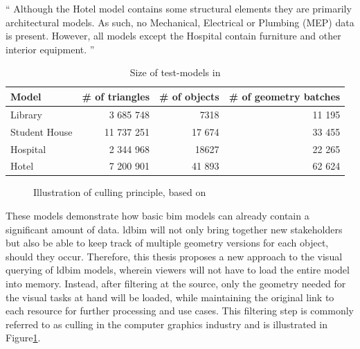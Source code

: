 \enquote{
	Although the Hotel model contains some structural elements they are primarily architectural models. As such, no Mechanical, Electrical or Plumbing (MEP) data is present. However, all models except the Hospital contain furniture and other interior equipment.
} \parencite{Johansson2015}

\begin{table}[h]
	\centering
	\begin{tabular}{@{}lrrr@{}}
		\toprule
		Model         & \multicolumn{1}{l}{\# of  triangles} & \multicolumn{1}{l}{\# of objects} & \multicolumn{1}{l}{\# of geometry batches} \\ \midrule
		Library       & 3 685 748                            & 7318                              & 11 195                                     \\
		Student House & 11 737 251                           & 17 674                            & 33 455                                     \\
		Hospital      & 2 344 968                            & 18627                             & 22 265                                     \\
		Hotel         & 7 200 901                            & 41 893                            & 62 624                                     \\ \bottomrule
	\end{tabular}
	\caption{Size of test-models in \cite{Johansson2015}}
	\label{tab:sizeModels}
\end{table}

\begin{figure}[h]
	\centering
	
	\caption[Illustration of culling principle]{Illustration of culling principle, based on \cite{CullingPrinciples}}
	\label{fig:cullingPrinciple}
\end{figure}

These models demonstrate how basic \ac{bim} models can already contain a significant amount of data. \ac{ldbim} will not only bring together new stakeholders but also be able to keep track of multiple geometry versions for each object, should they occur. Therefore, this thesis proposes a new approach to the visual querying of \ac{ldbim} models, wherein viewers will not have to load the entire model into memory. Instead, after filtering at the source, only the geometry needed for the visual tasks at hand will be loaded, while maintaining the original link to each resource for further processing and use cases. This filtering step is commonly referred to as culling in the computer graphics industry and is illustrated in Figure\ref{fig:cullingPrinciple}.

